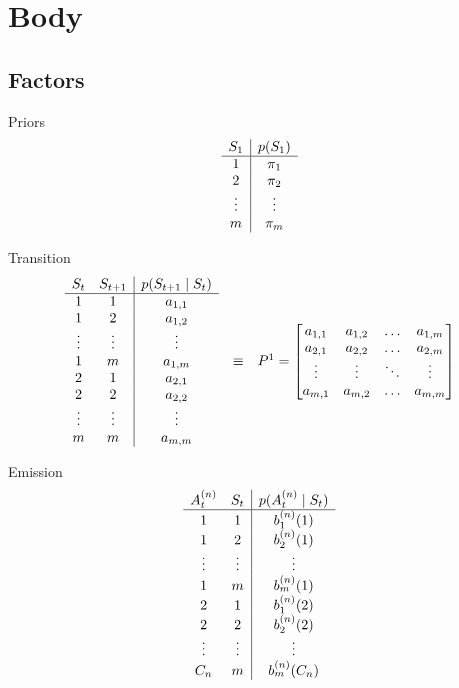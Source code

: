 \graphicspath{{body/fig/}}

\chapter{Body}
\label{chap:body}

\section{Factors}

Priors
\[
\begin{array}{c | c}
S_1 & p(S_1) \\ 
\hline
1 & \pi_1 \\ 
2 & \pi_2 \\ 
\vdots & \vdots \\
m & \pi_m \\ 
\end{array} 
\]

Transition
\[
\begin{array}{ccc}
\begin{array}{c c | c}
S_t & S_{t+1} & p(S_{t+1} \mid S_t) \\ 
\hline
1 & 1  & a_{1,1} \\ 
1 & 2  & a_{1,2} \\ 
\vdots & \vdots  & \vdots \\
1 & m  & a_{1,m} \\ 
2 & 1  & a_{2,1} \\ 
2 & 2  & a_{2,2} \\ 
\vdots & \vdots  & \vdots \\
m & m  & a_{m,m} \\ 
\end{array} 
&
\equiv
&
P^1 = 
\begin{bmatrix}
a_{1,1} & a_{1,2} & \dots & a_{1,m} \\
a_{2,1} & a_{2,2} & \dots & a_{2,m} \\
\vdots & \vdots & \ddots & \vdots \\
a_{m,1} & a_{m,2} & \dots & a_{m,m} \\
\end{bmatrix}
\end{array} 
\]


Emission
\[
\begin{array}{c c | c}
A^{(n)}_t & S_t & p(A^{(n)}_t \mid S_t) \\ 
\hline
1 & 1  & b_1^{(n)}(1) \\ 
1 & 2  & b_2^{(n)}(1) \\ 
\vdots & \vdots  & \vdots \\
1 & m  & b_m^{(n)}(1) \\ 
2 & 1  & b_1^{(n)}(2) \\ 
2 & 2  & b_2^{(n)}(2) \\ 
\vdots & \vdots  & \vdots \\
C_n & m  & b_m^{(n)}(C_n) \\ 
\end{array} 
\]

